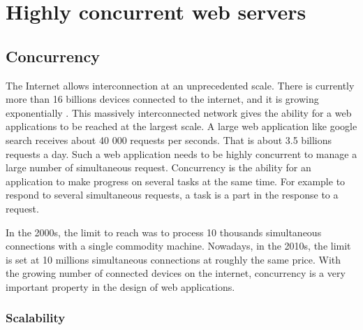 \section{Highly concurrent web servers} \label{chapter2:highly-concurrent-web-servers}


\subsection{Concurrency}

The Internet allows interconnection at an unprecedented scale.
There is currently more than 16 billions devices connected to the internet, and it is growing exponentially \cite{Hilbert2011a}.
This massively interconnected network gives the ability for a web applications to be reached at the largest scale.
A large web application like google search receives about 40 000 requests per seconds.
That is about 3.5 billions requests a day.
Such a web application needs to be highly concurrent to manage a large number of simultaneous request.
Concurrency is the ability for an application to make progress on several tasks at the same time.
For example to respond to several simultaneous requests, a task is a part in the response to a request. 

In the 2000s, the limit to reach was to process 10 thousands simultaneous connections with a single commodity machine.
Nowadays, in the 2010s, the limit is set at 10 millions simultaneous connections at roughly the same price.
With the growing number of connected devices on the internet, concurrency is a very important property in the design of web applications.

\subsubsection{Scalability}

